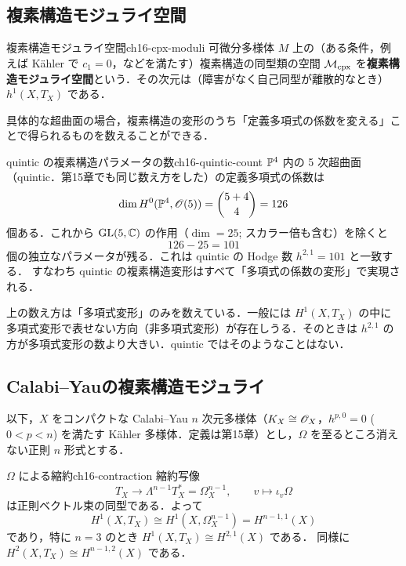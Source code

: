 \subsection{複素構造モジュライ空間}

\begin{mydef}{複素構造モジュライ空間}{ch16-cpx-moduli}
可微分多様体 $M$ 上の（ある条件，例えば K\"ahler で $c_1=0$，などを満たす）複素構造の同型類の空間 $\mathcal{M}_{\rm cpx}$ を\textbf{複素構造モジュライ空間}という．その次元は（障害がなく自己同型が離散的なとき）$h^1(X,T_X)$ である．
\end{mydef}

具体的な超曲面の場合，複素構造の変形のうち「定義多項式の係数を変える」ことで得られるものを数えることができる．

\begin{myex}{quintic の複素構造パラメータの数}{ch16-quintic-count}
$\mathbb{P}^4$ 内の 5 次超曲面（quintic．第15章でも同じ数え方をした）の定義多項式の係数は
\[
\dim H^0(\mathbb{P}^4,\mathscr{O}(5))=\binom{5+4}{4}=126
\]
個ある．これから $\operatorname{GL}(5,\mathbb{C})$ の作用（$\dim=25$; スカラー倍も含む）を除くと
\[
126-25=101
\]
個の独立なパラメータが残る．これは quintic の Hodge 数 $h^{2,1}=101$ と一致する．
すなわち quintic の複素構造変形はすべて「多項式の係数の変形」で実現される．
\end{myex}

\begin{note}
上の数え方は「多項式変形」のみを数えている．一般には $H^1(X,T_X)$ の中に多項式変形で表せない方向（非多項式変形）が存在しうる．そのときは $h^{2,1}$ の方が多項式変形の数より大きい．quintic ではそのようなことはない．
\end{note}

\subsection{Calabi--Yauの複素構造モジュライ}

以下，$X$ をコンパクトな Calabi--Yau $n$ 次元多様体（$K_X\cong\mathscr{O}_X$，$h^{p,0}=0$ ($0<p<n$) を満たす K\"ahler 多様体．定義は第15章）とし，$\Omega$ を至るところ消えない正則 $n$ 形式とする．

\begin{mylem}{$\Omega$ による縮約}{ch16-contraction}
縮約写像
\[
T_X\longrightarrow \Lambda^{n-1}T^*_X=\Omega^{n-1}_X,\qquad v\longmapsto \iota_v\Omega
\]
は正則ベクトル束の同型である．よって
\[
H^1(X,T_X)\cong H^1(X,\Omega^{n-1}_X)=H^{n-1,1}(X)
\]
であり，特に $n=3$ のとき $H^1(X,T_X)\cong H^{2,1}(X)$ である．
同様に $H^2(X,T_X)\cong H^{n-1,2}(X)$ である．
\end{mylem}


